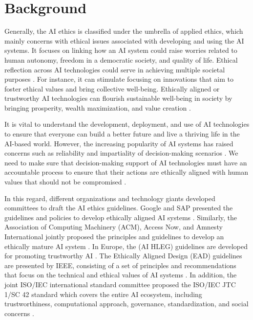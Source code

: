 \section{Background}
\label{Background}
Generally, the AI ethics is classified under the umbrella of applied ethics, which mainly concerns with ethical issues associated with developing and using the AI systems. It focuses on linking how an AI system could raise worries related to human autonomy, freedom in a democratic society, and quality of life. Ethical reflection across AI technologies could serve in achieving multiple societal purposes \cite{AR2}. For instance, it can stimulate focusing on innovations that aim to foster ethical values and bring collective well-being. Ethically aligned or trustworthy AI technologies can flourish sustainable well-being in society by bringing prosperity, wealth maximization, and value creation \cite{AR2}.    

It is vital to understand the development, deployment, and use of AI technologies to ensure that everyone can build a better future and live a thriving life in the AI-based world. However, the increasing popularity of AI systems has raised concerns such as reliability and impartiality of decision-making scenarios \cite{AR2}. We need to make sure that decision-making support of AI technologies must have an accountable process to ensure that their actions are ethically aligned with human values that should not be compromised \cite{AR2}.

In this regard, different organizations and technology giants developed committees to draft the AI ethics guidelines. Google and SAP presented the guidelines and policies to develop ethically aligned AI systems \cite{AR6}. Similarly, the Association of Computing Machinery (ACM), Access Now, and Amnesty International jointly proposed the principles and guidelines to develop an ethically mature AI system \cite{AR6}. In Europe, the (AI HLEG) guidelines are developed for promoting trustworthy AI \cite{AR2}. The Ethically Aligned Design (EAD) guidelines are presented by IEEE, consisting of a set of principles and recommendations that focus on the technical and ethical values of AI systems \cite{AR7}. In addition, the joint ISO/IEC international standard committee proposed the ISO/IEC JTC 1/SC 42 standard which covers the entire AI ecosystem, including trustworthiness, computational approach, governance, standardization, and social concerns \cite{AR8}.

